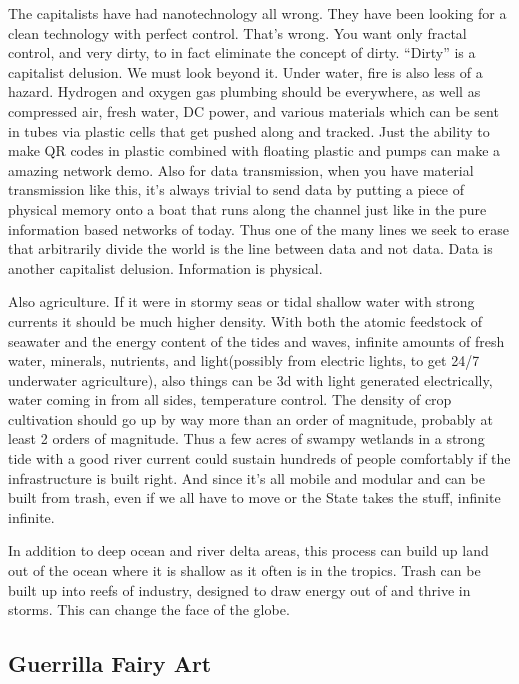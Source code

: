 The capitalists have had nanotechnology all wrong. They have been
looking for a clean technology with perfect control. That's wrong. You
want only fractal control, and very dirty, to in fact eliminate the
concept of dirty. ``Dirty'' is a capitalist delusion. We must look
beyond it. Under water, fire is also less of a hazard. Hydrogen and
oxygen gas plumbing should be everywhere, as well as compressed air,
fresh water, DC power, and various materials which can be sent in tubes
via plastic cells that get pushed along and tracked. Just the ability to
make QR codes in plastic combined with floating plastic and pumps can
make a amazing network demo. Also for data transmission, when you have
material transmission like this, it's always trivial to send data by
putting a piece of physical memory onto a boat that runs along the
channel just like in the pure information based networks of today. Thus
one of the many lines we seek to erase that arbitrarily divide the world
is the line between data and not data. Data is another capitalist
delusion. Information is physical.

Also agriculture. If it were in stormy seas or tidal shallow water with
strong currents it should be much higher density. With both the atomic
feedstock of seawater and the energy content of the tides and waves,
infinite amounts of fresh water, minerals, nutrients, and light(possibly
from electric lights, to get 24/7 underwater agriculture), also things
can be 3d with light generated electrically, water coming in from all
sides, temperature control. The density of crop cultivation should go up
by way more than an order of magnitude, probably at least 2 orders of
magnitude. Thus a few acres of swampy wetlands in a strong tide with a
good river current could sustain hundreds of people comfortably if the
infrastructure is built right. And since it's all mobile and modular and
can be built from trash, even if we all have to move or the State takes
the stuff, infinite infinite.

In addition to deep ocean and river delta areas, this process can build
up land out of the ocean where it is shallow as it often is in the
tropics. Trash can be built up into reefs of industry, designed to draw
energy out of and thrive in storms. This can change the face of the
globe.

\subsection{Guerrilla Fairy Art}\label{guerrilla-fairy-art}

